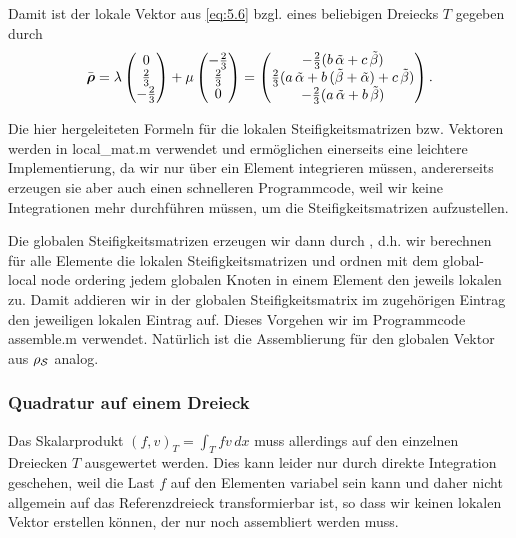 Damit ist der lokale Vektor aus \eqref{eq:5.6} bzgl. eines beliebigen Dreiecks $T$ gegeben durch
\[
	\bar{\boldsymbol \rho} = \lambda \begin{pmatrix}
								0 \\
								\frac 23 \\
								-\frac 23
							\end{pmatrix}+\mu  \begin{pmatrix}
								-\frac 23 \\
								\frac 23 \\
								0
							\end{pmatrix} = \begin{pmatrix}
					-\frac 23 (b\, \tilde \alpha + c\, \tilde\beta) \\
								\frac 23 (a\, \tilde\alpha + b\, (\tilde \beta + \tilde \alpha) + c\, \tilde\beta) \\
								-\frac 23 (a\,  \tilde \alpha + b\,  \tilde \beta)
							\end{pmatrix}.
\]

Die hier hergeleiteten Formeln für die lokalen Steifigkeitsmatrizen bzw. Vektoren werden in {\ttfamily local_mat.m} verwendet und ermöglichen einerseits eine leichtere Implementierung, da wir nur über ein Element integrieren müssen, andererseits erzeugen sie aber auch einen schnelleren Programmcode, weil wir keine Integrationen mehr durchführen müssen, um die Steifigkeitsmatrizen aufzustellen.

Die globalen Steifigkeitsmatrizen erzeugen wir dann durch , d.h. wir berechnen für alle Elemente die lokalen Steifigkeitsmatrizen und ordnen mit dem global-local node ordering jedem globalen Knoten in einem Element den jeweils lokalen zu. Damit addieren wir in der globalen Steifigkeitsmatrix im zugehörigen Eintrag den jeweiligen lokalen Eintrag auf. Dieses Vorgehen wir im Programmcode {\ttfamily assemble.m} verwendet. Natürlich ist die Assemblierung für den globalen Vektor aus $\rho_{\mathcal S}$ analog.


\subsubsection{Quadratur auf einem Dreieck}

Das Skalarprodukt $(f,v)_T = \int_T fv \, dx$ muss allerdings auf den einzelnen Dreiecken $T$ ausgewertet werden. Dies kann leider nur durch direkte Integration geschehen, weil die Last $f$ auf den Elementen variabel sein kann und daher nicht allgemein auf das Referenzdreieck transformierbar ist, so dass wir keinen lokalen Vektor erstellen können, der nur noch assembliert werden muss. 

